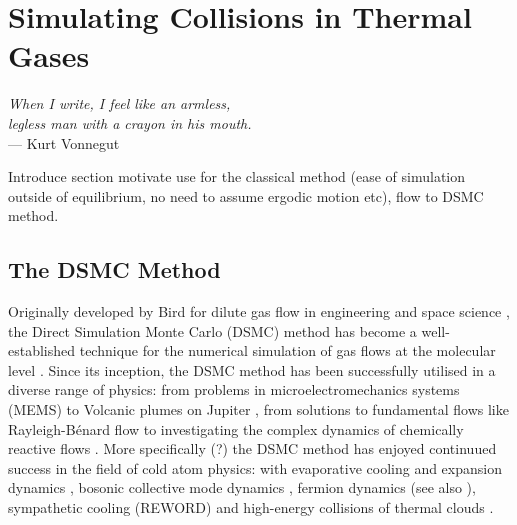 
\chapter{Simulating Collisions in Thermal Gases} %

\label{ch:inhomogas} %


\begin{flushright}{\slshape    
When I write, I feel like an armless,\\
legless man with a crayon in his mouth.} \\ \medskip
--- Kurt Vonnegut
\end{flushright}

\bigskip


Introduce section motivate use for the classical method (ease of simulation outside of equilibrium, no need to assume ergodic motion etc), flow to DSMC method.


\section{The DSMC Method} \label{sec:dsmc}

Originally developed by Bird for dilute gas flow in engineering and space science \cite{Bird1963,Bird1976,Bird1994}, the Direct Simulation Monte Carlo (DSMC) method has become a well-established technique for the numerical simulation of gas flows at the molecular level \cite{Bird2013}.
Since its inception, the DSMC method has been successfully utilised in a diverse range of physics: from problems in microelectromechanics systems (MEMS) \cite{Frangi2003} to Volcanic plumes on Jupiter \cite{Zhang2004}, from solutions to fundamental flows like Rayleigh-B\'enard flow \cite{Watanabe1994} to investigating the complex dynamics of chemically reactive flows \cite{Anderson2003,Goldsworthy2014}.
More specifically (?) the DSMC method has enjoyed continuued success in the field of cold atom physics: with evaporative cooling and expansion dynamics \cite{Wu1996, Wu1997, Wu1998}, bosonic collective mode dynamics \cite{Jackson2001, Jackson2001b, Jackson2002, Jackson2002b, Jackson2002c}, fermion dynamics \cite{Urban2006, Urban2007, Urban2008, Lepers2010} (see also \cite{Vignolo2002, Toschi2003, Capuzzi2004, Toschi2004}), sympathetic cooling \cite{Barletta2010, Barletta2011} (REWORD) and high-energy collisions of thermal clouds \cite{Wade2011}.

